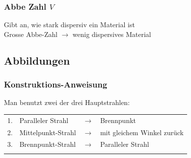 \subsubsection{Abbe Zahl $V$}

Gibt an, wie stark dispersiv ein Material ist \\
Grosse Abbe-Zahl $\rightarrow$ wenig dispersives Material




\subsection{Abbildungen}

\subsubsection{Konstruktions-Anweisung}

Man benutzt zwei der drei Hauptstrahlen: \\

\begin{tabular}{l l c l}
1. & Paralleler Strahl & $\rightarrow$ & Brennpunkt \\
2. & Mittelpunkt-Strahl & $\rightarrow$ & mit gleichem Winkel zurück \\
3. & Brennpunkt-Strahl & $\rightarrow$ & Paralleler Strahl \\
\\
\end{tabular}



